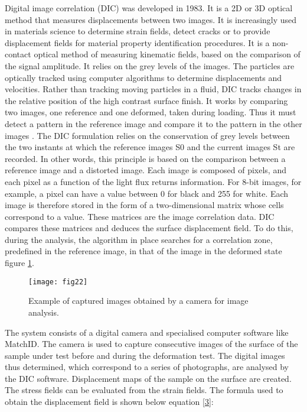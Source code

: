 Digital image correlation (DIC) was developed in 1983. It is a 2D or 3D optical method that measures displacements between two images. It is increasingly used in materials science to determine strain fields, detect cracks or to provide displacement fields for material property identification procedures. It is a non-contact optical method of measuring kinematic fields, based on the comparison of the signal amplitude. It relies on the grey levels of the images. The particles are optically tracked using computer algorithms to determine displacements and velocities. Rather than tracking moving particles in a fluid, DIC tracks changes in the relative position of the high contrast surface finish. It works by comparing two images, one reference and one deformed, taken during loading. Thus it must detect a pattern in the reference image and compare it to the pattern in the other images \cite{Reference13}. The DIC formulation relies on the conservation of grey levels between the two instants at which the reference images S0 and the current images St are recorded. In other words, this principle is based on the comparison between a reference image and a distorted image. Each image is composed of pixels, and each pixel as a function of the light flux returns information. For 8-bit images, for example, a pixel can have a value between 0 for black and 255 for white. Each image is therefore stored in the form of a two-dimensional matrix whose cells correspond to a value. These matrices are the image correlation data. DIC compares these matrices and deduces the surface displacement field. To do this, during the analysis, the algorithm in place searches for a correlation zone, predefined in the reference image, in that of the image in the deformed state figure \ref{fig:fig22}.

\graphicspath{{Images/}}
\begin{figure}[htp]
	\centering
	\texttt{[image: fig22]}
	\caption{Example of captured images obtained by a camera for image analysis.}
	\label{fig:fig22}
\end{figure}

The system consists of a digital camera and specialised computer software like MatchID. The camera is used to capture consecutive images of the surface of the sample under test before and during the deformation test. The digital images thus determined, which correspond to a series of photographs, are analysed by the DIC software. Displacement maps of the sample on the surface are created. The stress fields can be evaluated from the strain fields. The formula used to obtain the displacement field is shown below equation \ref{3}:

